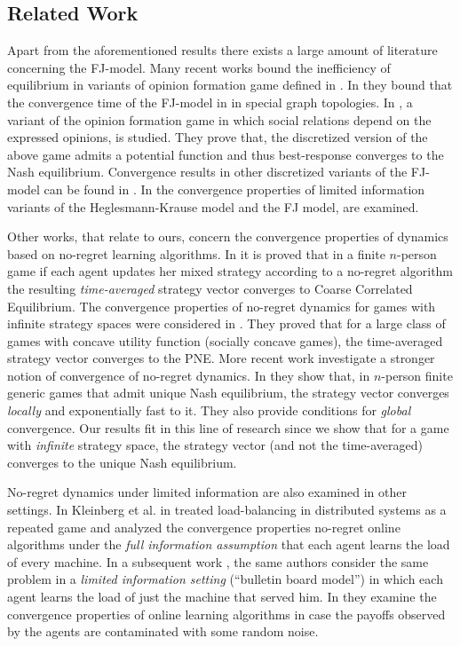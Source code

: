 \subsection{Related Work}
Apart from the aforementioned results there exists a large amount
of literature concerning the FJ-model.
Many recent works \cite{BGM13,CKO13,BFM16,EFHS17} bound the
inefficiency of equilibrium in variants of opinion formation game
defined in \cite{BKO11}. In \cite{GS14} they bound that the convergence
time of the FJ-model in in special graph topologies.
In \cite{BFM16}, a variant of the opinion formation game in which social
relations depend on the expressed opinions, is studied.
They prove that, the discretized version of the above game admits
a potential function and thus best-response converges to the
Nash equilibrium. Convergence results in other discretized variants of
the FJ-model can be found in \cite{YOASS13,FGV16}. In \cite{FPS16} the convergence
properties of limited information variants of the Heglesmann-Krause model \cite{HK}
and the FJ model, are examined.


Other works, that relate to ours, concern the convergence
properties of dynamics based on no-regret learning algorithms.
In \cite{FV97,FS99,SA00,SALS15} it is proved that in a finite $n$-person
game if each agent updates her mixed strategy according to a no-regret
algorithm the resulting \emph{time-averaged} strategy vector converges to
Coarse Correlated Equilibrium. The convergence properties of no-regret dynamics
for games with infinite strategy spaces were considered in \cite{EMN09}.
They proved that for a large class of games with concave utility function
(socially concave games), the time-averaged strategy vector converges to
the PNE. More recent work investigate a stronger notion of convergence of
no-regret dynamics. In \cite{CHM17} they show that,
in $n$-person finite generic games that admit unique Nash equilibrium,
the strategy vector converges \emph{locally} and exponentially fast
to it. They also provide conditions for \emph{global} convergence.
Our results fit in this line of research since we show that
for a game with \emph{infinite} strategy space, the strategy vector
(and not the time-averaged) converges to the unique Nash equilibrium.

No-regret dynamics under limited information are also examined
in other settings. In Kleinberg et al. in \cite{KPT09} treated
load-balancing in distributed systems as
a repeated game and analyzed the convergence properties
no-regret online algorithms under the \emph{full information assumption}
that each agent learns the load of every machine.
In a subsequent work \cite{KPT11}, the same authors consider the
same problem in a \emph{limited information setting} (\enquote{bulletin board model})
in which each agent learns the load of just the machine
that served him. In \cite{HCM17,MS17} they examine the convergence
properties of online learning algorithms in case the payoffs observed
by the agents are contaminated with some random noise.

